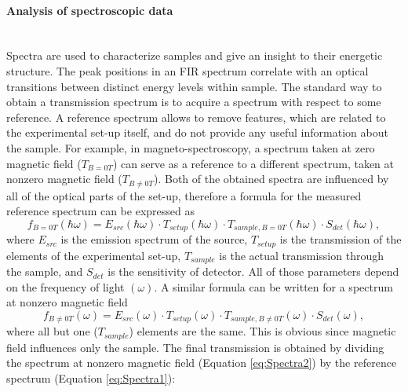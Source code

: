 \documentclass[titlepage,a4paper]{book}
\newcommand{\wciecie}{\quad\phantom{v}}
\newcommand{\myparagraph}[1]{\paragraph{#1}\mbox{}\\}
\begin{document}
\myparagraph{Analysis of spectroscopic data}
\wciecie
Spectra are used to characterize samples and give an insight to their energetic structure. The peak positions in an FIR spectrum correlate with an optical transitions between distinct energy levels within sample. The standard way to obtain a transmission spectrum is to acquire a spectrum with respect to some reference. A reference spectrum allows to remove features, which are related to the experimental set-up itself, and do not provide any useful information about the sample. For example, in magneto-spectroscopy, a spectrum taken at zero magnetic field ($T_{B=0T}$) can serve as a reference to a different spectrum, taken at nonzero magnetic field ($T_{B\neq 0T}$). Both of the obtained spectra are influenced by all of the optical parts of the set-up, therefore a formula for the measured reference spectrum can be expressed as 
\begin{equation}
\label{eq:Spectra1}
f_{B=0T}(\hbar\omega) = E_{src}(\hbar\omega)\cdot T_{setup}(\hbar\omega)\cdot T_{sample,B=0T}(\hbar\omega)\cdot S_{det}(\hbar\omega),
\end{equation}
where $E_{src}$ is the emission spectrum of the source, $T_{setup}$ is the transmission of the elements of the experimental set-up, $T_{sample}$ is the actual transmission through the sample, and $S_{det}$ is the sensitivity of detector. All of those parameters depend on the frequency of light $(\omega)$. A similar formula can be written for a spectrum at nonzero magnetic field
\begin{equation}
\label{eq:Spectra2}
f_{B\neq 0T}(\omega) = E_{src}(\omega)\cdot T_{setup}(\omega)\cdot T_{sample,B\neq 0T}(\omega)\cdot S_{det}(\omega),
\end{equation}
where all but one ($T_{sample}$) elements are the same. This is obvious since magnetic field influences only the sample. The final transmission is obtained by dividing the spectrum at nonzero magnetic field (Equation \ref{eq:Spectra2}) by the reference spectrum (Equation \ref{eq:Spectra1}):
\end{document}
